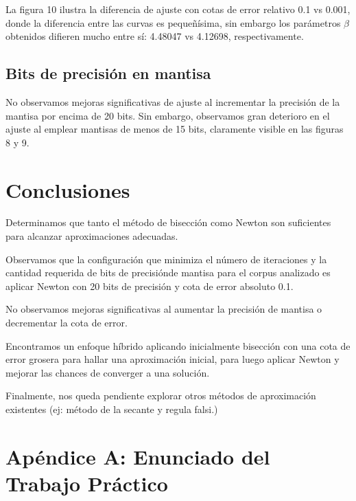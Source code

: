 \documentclass[a4paper,10pt,twoside]{article}
\begin{document}
La figura 10 ilustra la diferencia de ajuste con cotas de error relativo 0.1 vs 0.001,
donde la diferencia entre las curvas es pequeñísima, sin embargo los parámetros
$\beta$ obtenidos difieren mucho entre sí: 4.48047 vs 4.12698, respectivamente.


\subsection{Bits de precisión en mantisa}
No observamos mejoras significativas de ajuste al incrementar la precisión de
la mantisa por encima de 20 bits. Sin embargo, observamos gran deterioro en el
ajuste al emplear mantisas de menos de 15 bits, claramente visible en las figuras
8 y 9.




\section{Conclusiones}

Determinamos que tanto el método de bisección como Newton son suficientes para
alcanzar aproximaciones adecuadas.

Observamos que la configuración que minimiza el número de iteraciones y la
cantidad requerida de bits de precisiónde mantisa para el corpus analizado es
aplicar Newton con 20 bits de precisión y cota de error absoluto 0.1.

No observamos mejoras significativas al aumentar la precisión de mantisa o
decrementar la cota de error.

Encontramos un enfoque híbrido aplicando inicialmente bisección con una cota de
error grosera para hallar una aproximación inicial, para luego aplicar Newton y
mejorar las chances de converger a una solución.

Finalmente, nos queda pendiente explorar otros  métodos de aproximación existentes
(ej: método de la secante y regula falsi.)




\section{Apéndice A: Enunciado del Trabajo Práctico}
\end{document}
